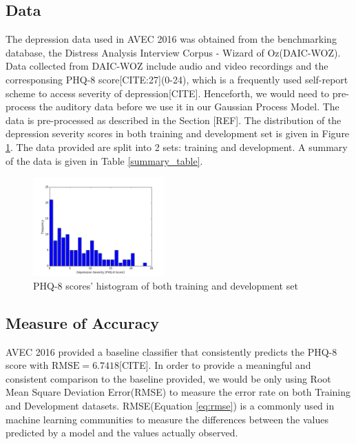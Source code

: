 \documentclass{article}
\begin{document}
	\subsection{Data}
	The depression data used in AVEC 2016 was obtained from the benchmarking database, the Distress Analysis Interview Corpus - Wizard of Oz(DAIC-WOZ). Data collected from DAIC-WOZ include audio and video recordings and the corresponsing PHQ-8 score[CITE:27](0-24), which is a frequently used self-report scheme to access severity of depression[CITE]. Henceforth, we would need to pre-process the auditory data before we use it in our Gaussian Process Model. The data is pre-processed as described in the Section [REF]. The distribution of the depression severity scores in both training and development set is given in Figure \ref{histogram_phq8}. The data provided are split into 2 sets: training and development. A summary of the data is given in Table \ref{summary_table}.
	\begin{figure}
	  \includegraphics[width=0.45\textwidth]{histogram_phq8}
	  \caption{PHQ-8 scores' histogram of both training and development set}
	  \label{histogram_phq8}
	 \end{figure}
 \subsection{Measure of Accuracy}
 AVEC 2016 provided a baseline classifier that consistently predicts the PHQ-8 score with $\text{RMSE}=6.7418$[CITE]. In order to provide a meaningful and consistent comparison to the baseline provided, we would be only using Root Mean Square Deviation Error(RMSE) to measure the error rate on both Training and Development datasets. RMSE(Equation \ref{eq:rmse}) is a commonly used in machine learning communities to measure the differences between the values predicted by a model and the values actually observed. 
\end{document}
